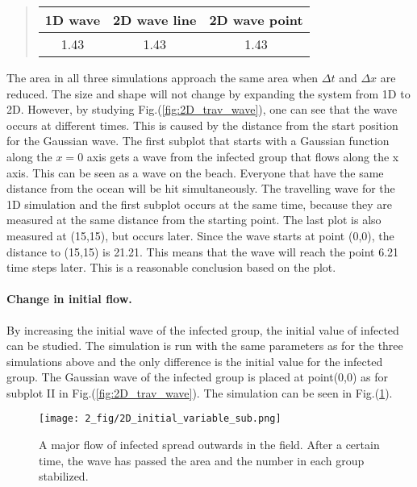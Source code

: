 \documentclass[%
twoside,                 %
final,                   %
chapterprefix=true,      %
open=right               %
10pt]{book}
\begin{document}
\label{table:wave_values}

\begin{quote}
\begin{tabular}{ccc}
\hline
\multicolumn{1}{c}{ 1D wave } & \multicolumn{1}{c}{ 2D wave line } & \multicolumn{1}{c}{ 2D wave point } \\
\hline
1.43    & 1.43         & 1.43          \\
\hline
\end{tabular}
\end{quote}

\noindent
The area in all three simulations approach the same area when $\Delta t$ and $\Delta x$ are reduced. The size and shape will not change by  expanding the system from 1D to 2D. However, by studying Fig.(\ref{fig:2D_trav_wave}), one can see that the wave occurs at different times. This is caused by the distance from the start position for the Gaussian wave. The first subplot that starts with a Gaussian function along the $x=0$ axis gets a wave from the infected group that flows along the x axis. This can be seen as a wave on the beach. Everyone that have the same distance from the ocean will be hit simultaneously. The travelling wave for the 1D simulation and the first subplot occurs at the same time, because they are measured at the same distance from the starting point. The last plot is also measured at (15,15), but occurs later. Since the wave starts at point (0,0), the distance to (15,15) is 21.21. This means that the wave will reach the point 6.21 time steps later. This is a reasonable conclusion based on the plot.    

\paragraph{Change in initial flow.}
By increasing the initial wave of the infected group, the initial value of infected can be studied. The simulation is run with the same parameters as for the three simulations above and the only difference is the initial value for the infected group. The Gaussian wave of the infected group is placed at point(0,0) as for subplot II in Fig.(\ref{fig:2D_trav_wave}). The simulation can be seen in Fig.(\ref{fig:initial_value}).  


\begin{figure}[ht]
  \centerline{\texttt{[image: 2\_fig/2D\_initial\_variable\_sub.png]}}
  \caption{
  \label{fig:initial_value} A major flow of infected spread outwards in the field. After a certain time, the wave has passed the area and the number in each group stabilized.
  }
\end{figure}
\end{document}
